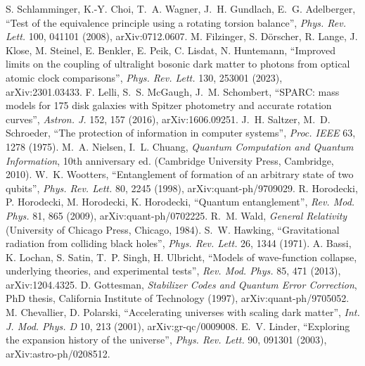  S. Schlamminger, K.-Y. Choi, T.~A. Wagner, J.~H. Gundlach, E.~G. Adelberger, ``Test of the equivalence principle
using a rotating torsion balance'', \emph{Phys. Rev. Lett.} 100, 041101 (2008), arXiv:0712.0607.
 M. Filzinger, S. D\"orscher, R. Lange, J. Klose, M. Steinel, E. Benkler, E. Peik, C. Lisdat, N. Huntemann,
``Improved limits on the coupling of ultralight bosonic dark matter to photons from optical atomic clock comparisons'', \emph{Phys. Rev.
Lett.} 130, 253001 (2023), arXiv:2301.03433.
 F. Lelli, S.~S. McGaugh, J.~M. Schombert, ``SPARC: mass models for 175 disk galaxies with Spitzer photometry and
accurate rotation curves'', \emph{Astron. J.} 152, 157 (2016), arXiv:1606.09251.
 J.~H. Saltzer, M.~D. Schroeder, ``The protection of information in computer systems'', \emph{Proc. IEEE} 63, 1278
(1975).
 M.~A. Nielsen, I.~L. Chuang, \emph{Quantum Computation and Quantum Information}, 10th anniversary ed. (Cambridge
University Press, Cambridge, 2010).
 W.~K. Wootters, ``Entanglement of formation of an arbitrary state of two qubits'', \emph{Phys. Rev. Lett.} 80, 2245
(1998), arXiv:quant-ph/9709029.
 R. Horodecki, P. Horodecki, M. Horodecki, K. Horodecki, ``Quantum entanglement'', \emph{Rev. Mod. Phys.} 81, 865
(2009), arXiv:quant-ph/0702225.
 R.~M. Wald, \emph{General Relativity} (University of Chicago Press, Chicago, 1984).
 S.~W. Hawking, ``Gravitational radiation from colliding black holes'', \emph{Phys. Rev. Lett.} 26, 1344 (1971).
 A. Bassi, K. Lochan, S. Satin, T.~P. Singh, H. Ulbricht, ``Models of wave-function collapse, underlying theories, and
experimental tests'', \emph{Rev. Mod. Phys.} 85, 471 (2013), arXiv:1204.4325.
 D. Gottesman, \emph{Stabilizer Codes and Quantum Error Correction}, PhD thesis, California Institute of Technology
(1997), arXiv:quant-ph/9705052.
 M. Chevallier, D. Polarski, ``Accelerating universes with scaling dark matter'', \emph{Int. J. Mod. Phys. D} 10,
213 (2001), arXiv:gr-qc/0009008.
 E.~V. Linder, ``Exploring the expansion history of the universe'', \emph{Phys. Rev. Lett.} 90, 091301 (2003),
arXiv:astro-ph/0208512.
